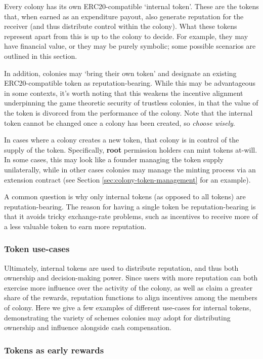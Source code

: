 Every colony has its own ERC20-compatible `internal token'. These are the tokens that, when earned as an expenditure payout, also generate reputation for the receiver (and thus distribute control within the colony). What these tokens represent apart from this is up to the colony to decide. For example, they may have financial value, or they may be purely symbolic; some possible scenarios are outlined in this section.

In addition, colonies may `bring their own token' and designate an existing ERC20-compatible token as reputation-bearing. While this may be advantageous in some contexts, it’s worth noting that this weakens the incentive alignment underpinning the game theoretic security of trustless colonies, in that the value of the token is divorced from the performance of the colony. Note that the internal token cannot be changed once a colony has been created, so \textit{choose wisely}.

In cases where a colony creates a new token, that colony is in control of the supply of the token. Specifically, \textbf{root} permission holders can mint tokens at-will. In some cases, this may look like a founder managing the token supply unilaterally, while in other cases colonies may manage the minting process via an extension contract (see Section \ref{sec:colony-token-management} for an example).

A common question is why only internal tokens (as opposed to all tokens) are reputation-bearing. The reason for having a single token be reputation-bearing is that it avoids tricky exchange-rate problems, such as incentives to receive more of a less valuable token to earn more reputation.

\subsubsection{Token use-cases}

Ultimately, internal tokens are used to distribute reputation, and thus both ownership and decision-making power. Since users with more reputation can both exercise more influence over the activity of the colony, as well as claim a greater share of the rewards, reputation functions to align incentives among the members of colony. Here we give a few examples of different use-cases for internal tokens, demonstrating the variety of schemes colonies may adopt for distributing ownership and influence alongside cash compensation.

\subsubsection*{Tokens as early rewards}

